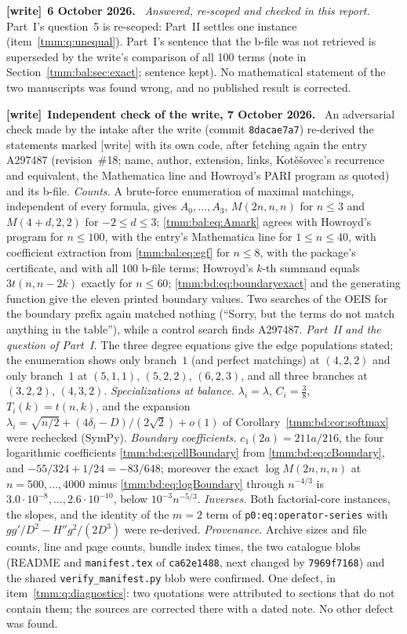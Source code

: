 \documentclass[11pt,letterpaper]{article}
\theoremstyle{remark}\newtheorem{remark}[theorem]{Remark}
\newcommand{\file}[1]{\nolinkurl{#1}}
\newenvironment{writenote}[1][]{\par\smallskip\begingroup\small
 \noindent\textbf{[write]}\if\relax\detokenize{#1}\relax\else~\textbf{#1.}\fi\ }%
 {\par\endgroup\smallskip}
\begin{document}
\begin{writenote}[6 October 2026]
\emph{Answered, re-scoped and checked in this report.} Part~I's question~5 is re-scoped: Part~II settles one instance (item~\ref{tmm:q:unequal}). Part~I's sentence that the b-file was not retrieved is superseded by the write's comparison of all 100 terms (note in Section~\ref{tmm:bal:sec:exact}; sentence kept). No mathematical statement of the two manuscripts was found wrong, and no published result is corrected.
\end{writenote}
\begin{writenote}[Independent check of the write, 7 October 2026]
An adversarial check made by the intake after the write (commit \file{8dacae7a7}) re-derived the statements marked [write] with its own code, after fetching again the entry A297487 (revision~\#18; name, author, extension, links, Kot\v e\v sovec's recurrence and equivalent, the Mathematica line and Howroyd's PARI program as quoted) and its b-file. \emph{Counts.} A brute-force enumeration of maximal matchings, independent of every formula, gives $A_0,\dots,A_3$, $M(2n,n,n)$ for $n\le3$ and $M(4+d,2,2)$ for $-2\le d\le3$; \eqref{tmm:bal:eq:Amark} agrees with Howroyd's program for $n\le100$, with the entry's Mathematica line for $1\le n\le40$, with coefficient extraction from \eqref{tmm:bal:eq:egf} for $n\le8$, with the package's certificate, and with all 100 b-file terms; Howroyd's $k$-th summand equals $3t(n,n-2k)$ exactly for $n\le60$; \eqref{tmm:bd:eq:boundaryexact} and the generating function give the eleven printed boundary values. Two searches of the OEIS for the boundary prefix again matched nothing (``Sorry, but the terms do not match anything in the table''), while a control search finds A297487. \emph{Part~II and the question of Part~I.} The three degree equations give the edge populations stated; the enumeration shows only branch~$1$ (and perfect matchings) at $(4,2,2)$ and only branch~$1$ at $(5,1,1)$, $(5,2,2)$, $(6,2,3)$, and all three branches at $(3,2,2)$, $(4,3,2)$. \emph{Specializations at balance.} $\lambda_i=\lambda$, $C_i=\frac38$, $T_i(k)=t(n,k)$, and the expansion $\lambda_i=\sqrt{n/2}+(4\delta_i-D)/(2\sqrt2)+o(1)$ of Corollary~\ref{tmm:bd:cor:softmax} were rechecked (SymPy). \emph{Boundary coefficients.} $c_1(2a)=211a/216$, the four logarithmic coefficients \eqref{tmm:bd:eq:ellBoundary} from \eqref{tmm:bd:eq:cBoundary}, and $-55/324+1/24=-83/648$; moreover the exact $\log M(2n,n,n)$ at $n=500,\dots,4000$ minus \eqref{tmm:bd:eq:logBoundary} through $n^{-4/3}$ is $3.0\cdot10^{-8},\dots,2.6\cdot10^{-10}$, below $10^{-3}n^{-5/3}$. \emph{Inverses.} Both factorial-core instances, the slopes, and the identity of the $m=2$ term of \file{p0:eq:operator-series} with $gg'/D^2-H''g^2/(2D^3)$ were re-derived. \emph{Provenance.} Archive sizes and file counts, line and page counts, bundle index times, the two catalogue blobs (README and \file{manifest.tex} of \file{ca62e1488}, next changed by \file{7969f7168}) and the shared \file{verify\_manifest.py} blob were confirmed. One defect, in item~\ref{tmm:q:diagnostics}: two quotations were attributed to sections that do not contain them; the sources are corrected there with a dated note. No other defect was found.
\end{writenote}
\end{document}
